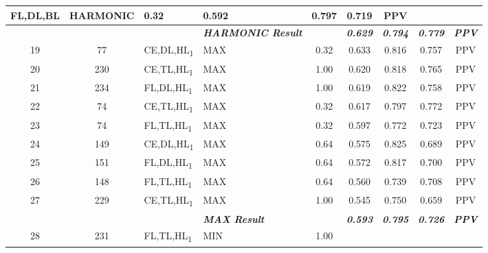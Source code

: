 \begin{table}[H]
{\begin{tabular}{ccl|l|c|c|c|c|c|}
    FL,DL,BL &
    HARMONIC &
    0.32 &
    0.592 &
    0.797 &
    0.719 &
    PPV \\ \hline
   &
    \textit{\textbf{}} &
     &
    \textit{\textbf{HARMONIC Result}} &
     &
    \textit{\textbf{0.629}} &
    \textit{\textbf{0.794}} &
    \textit{\textbf{0.779}} &
    \textit{\textbf{PPV}} \\ \hline
  \multicolumn{1}{|c|}{19} &
    \multicolumn{1}{c|}{77} &
    CE,DL,HL\textsubscript{1} &
    MAX &
    0.32 &
    0.633 &
    0.816 &
    0.757 &
    PPV \\ \hline
  \multicolumn{1}{|c|}{20} &
    \multicolumn{1}{c|}{230} &
    CE,TL,HL\textsubscript{1} &
    MAX &
    1.00 &
    0.620 &
    0.818 &
    0.765 &
    PPV \\ \hline
  \multicolumn{1}{|c|}{21} &
    \multicolumn{1}{c|}{234} &
    FL,DL,HL\textsubscript{1} &
    MAX &
    1.00 &
    0.619 &
    0.822 &
    0.758 &
    PPV \\ \hline
  \multicolumn{1}{|c|}{22} &
    \multicolumn{1}{c|}{74} &
    CE,TL,HL\textsubscript{1} &
    MAX &
    0.32 &
    0.617 &
    0.797 &
    0.772 &
    PPV \\ \hline
  \multicolumn{1}{|c|}{23} &
    \multicolumn{1}{c|}{74} &
    FL,TL,HL\textsubscript{1} &
    MAX &
    0.32 &
    0.597 &
    0.772 &
    0.723 &
    PPV \\ \hline
  \multicolumn{1}{|c|}{24} &
    \multicolumn{1}{c|}{149} &
    CE,DL,HL\textsubscript{1} &
    MAX &
    0.64 &
    0.575 &
    0.825 &
    0.689 &
    PPV \\ \hline
  \multicolumn{1}{|c|}{25} &
    \multicolumn{1}{c|}{151} &
    FL,DL,HL\textsubscript{1} &
    MAX &
    0.64 &
    0.572 &
    0.817 &
    0.700 &
    PPV \\ \hline
  \multicolumn{1}{|c|}{26} &
    \multicolumn{1}{c|}{148} &
    FL,TL,HL\textsubscript{1} &
    MAX &
    0.64 &
    0.560 &
    0.739 &
    0.708 &
    PPV \\ \hline
  \multicolumn{1}{|c|}{27} &
    \multicolumn{1}{c|}{229} &
    CE,TL,HL\textsubscript{1} &
    MAX &
    1.00 &
    0.545 &
    0.750 &
    0.659 &
    PPV \\ \hline
   &
    \textit{\textbf{}} &
     &
    \textit{\textbf{MAX Result}} &
     &
    \textit{\textbf{0.593}} &
    \textit{\textbf{0.795}} &
    \textit{\textbf{0.726}} &
    \textit{\textbf{PPV}} \\ \hline
  \multicolumn{1}{|c|}{28} &
    \multicolumn{1}{c|}{231} &
    FL,TL,HL\textsubscript{1} &
    MIN &
    1.00 &

\end{tabular}}
\end{table}
